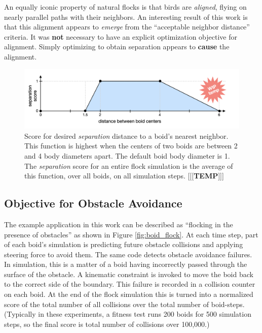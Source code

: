 \documentclass[letterpaper]{article}
\begin{document}
An equally iconic property of natural flocks is that birds are \textit{aligned}, flying on nearly parallel paths with their neighbors. An interesting result of this work is that this alignment appears to \textit{emerge} from the ``acceptable neighbor distance'' criteria. It was \textbf{not} necessary to have an explicit optimization objective for alignment. Simply optimizing to obtain separation appears to \textbf{cause} the alignment.


\begin{figure}[t]
    \centering
    \includegraphics[width=0.9\linewidth]{images/temp_sep_score.png}
    \caption{Score for desired \textit{separation} distance to a boid's nearest neighbor. This function is highest when the centers of two boids are between 2 and 4 body diameters apart. The default boid body diameter is 1. The \textit{separation} score for an entire flock simulation is the average of this function, over all boids, on all simulation steps. [[[\textbf{TEMP}]]]}
    \label{fig:SeparationScore}
\end{figure}

\subsection{Objective for Obstacle Avoidance}
\label{subsec:avoidance_objective}

The example application in this work can be described as ``flocking in the presence of obstacles'' as shown in Figure \ref{fig:boid_flock}. At each time step, part of each boid's simulation is predicting future obstacle collisions and applying steering force to avoid them. The same code detects obstacle avoidance failures. In simulation, this is a matter of a boid having incorrectly passed through the surface of the obstacle. A kinematic constraint is invoked to move the boid back to the correct side of the boundary. This failure is recorded in a collision counter on each boid. At the end of the flock simulation this is turned into a normalized score of the total number of all collisions over the total number of boid-steps. (Typically in these experiments, a fitness test runs 200 boids for 500 simulation steps, so the final score is total number of collisions over 100,000.) 
\end{document}

